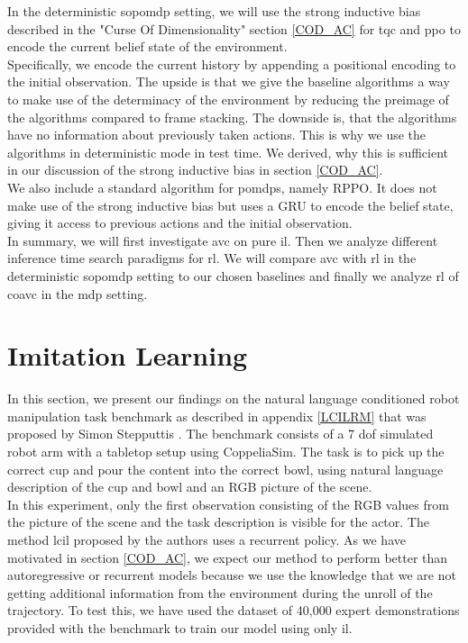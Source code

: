In the deterministic \ac{sopomdp} setting, we will use the strong inductive bias described in the "Curse Of Dimensionality" 
section \ref{COD_AC} for \ac{tqc} and \ac{ppo} to encode the current belief state of the environment. \\

Specifically, we encode the current history by appending a positional encoding to the initial observation. The upside is that we give 
the baseline algorithms a way to make use of the determinacy of the environment by reducing the preimage of the algorithms compared to 
frame stacking. The downside is, that the algorithms have no information about previously taken actions. This is why we use the 
algorithms in deterministic mode in test time. We derived, why this is sufficient in our discussion of the strong inductive bias in 
section \ref{COD_AC}.\\

We also include a standard algorithm for \ac{pomdp}s, namely RPPO. It does not make use of the strong inductive bias but uses a GRU 
to encode the belief state, giving it access to previous actions and the initial observation.\\


In summary, we will first investigate \ac{avc} on pure \ac{il}. Then we analyze different inference time search 
paradigms for \ac{rl}. We will compare \ac{avc} with \ac{rl} in the deterministic \ac{sopomdp} setting to our chosen baselines and finally we analyze 
\ac{rl} of \ac{coavc} in the \ac{mdp} setting.


\section{Imitation Learning}
\label{sec:exp_imi_lr}
In this section, we present our findings on the natural language conditioned robot manipulation task benchmark as described in appendix \ref{LCILRM} that was proposed by 
Simon Stepputtis \etAl \cite{stepputtis2020languageconditioned}. The benchmark consists of a 7 dof simulated robot arm with a 
tabletop setup using CoppeliaSim. The task is to pick 
up the correct cup and pour the content into the correct bowl, using natural language description of the cup and bowl and an RGB 
picture of the scene.\\

In this experiment, only the first observation consisting of the RGB values from the picture of the 
scene and the task description is visible for the actor. The method \ac{lcil} 
proposed by the authors uses a recurrent policy. As we have motivated in section \ref{COD_AC}, we expect our method to perform better than autoregressive or recurrent 
models because we use the knowledge that we are not getting additional information from the environment during the unroll of the trajectory. 
To test this, we have used the dataset of 40,000 expert demonstrations provided with the benchmark to train our model using only \ac{il}.\\

